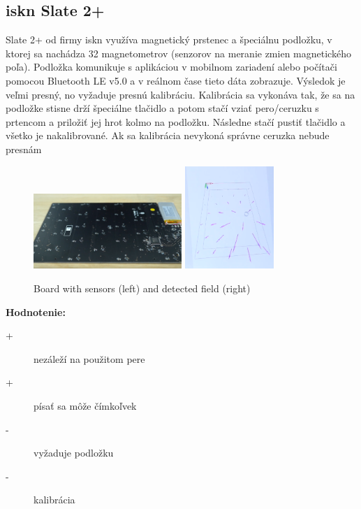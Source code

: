 \subsection*{iskn Slate 2+}

Slate 2+ od firmy iskn využíva magnetický prstenec a špeciálnu podložku, v ktorej sa nachádza 32 magnetometrov (senzorov na meranie zmien magnetického poľa). Podložka komunikuje s aplikáciou v mobilnom zariadení alebo počítači pomocou Bluetooth LE v5.0 a v reálnom čase tieto dáta zobrazuje. Výsledok je veľmi presný, no vyžaduje presnú kalibráciu. Kalibrácia sa vykonáva tak, že sa na podložke stisne drží špeciálne tlačidlo a potom stačí vziať pero/ceruzku s prtencom a priložiť jej hrot kolmo na podložku. Následne stačí pustiť tlačidlo a všetko je nakalibrované. Ak sa kalibrácia nevykoná správne ceruzka nebude presnám \newline

\begin{figure}[hbt]
	\centering
	\includegraphics[width=0.5\textwidth]{obrazky-figures/isknBoard.png}
	\includegraphics[width=0.3\textwidth]{obrazky-figures/isknMagneticfield.png}
	\caption{Board with sensors (left) and detected field (right)}
	\label{piezoPen1997}
\end{figure}
\textbf{Hodnotenie:}
\begin{description}
	\item[+]{nezáleží na použitom pere}
	\item[+]{písať sa môže čímkoľvek}
	\item[-]{vyžaduje podložku}
	\item[-]{kalibrácia}
\end{description}

